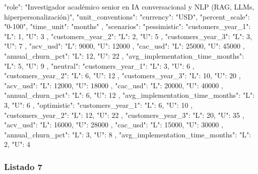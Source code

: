 \begin{APACode}
{
  "role": "Investigador académico senior en IA conversacional y NLP (RAG, LLMs, hiperpersonalización)",
  "unit_conventions": {
    "currency": "USD",
    "percent_scale": "0-100",
    "time_unit": "months"
  },
  "scenarios": {
    "pessimistic": {
      "customers_year_1": {
        "L": 1,
        "U": 3
      },
      "customers_year_2": {
        "L": 2,
        "U": 5
      },
      "customers_year_3": {
        "L": 3,
        "U": 7
      },
      "acv_usd": {
        "L": 9000,
        "U": 12000
      },
      "cac_usd": {
        "L": 25000,
        "U": 45000
      },
      "annual_churn_pct": {
        "L": 12,
        "U": 22
      },
      "avg_implementation_time_months": {
        "L": 5,
        "U": 9
      }
    },
    "neutral": {
      "customers_year_1": {
        "L": 3,
        "U": 6
      },
      "customers_year_2": {
        "L": 6,
        "U": 12
      },
      "customers_year_3": {
        "L": 10,
        "U": 20
      },
      "acv_usd": {
        "L": 12000,
        "U": 18000
      },
      "cac_usd": {
        "L": 20000,
        "U": 40000
      },
      "annual_churn_pct": {
        "L": 6,
        "U": 12
      },
      "avg_implementation_time_months": {
        "L": 3,
        "U": 6
      }
    },
    "optimistic": {
      "customers_year_1": {
        "L": 6,
        "U": 10
      },
      "customers_year_2": {
        "L": 12,
        "U": 22
      },
      "customers_year_3": {
        "L": 20,
        "U": 35
      },
      "acv_usd": {
        "L": 16000,
        "U": 28000
      },
      "cac_usd": {
        "L": 15000,
        "U": 30000
      },
      "annual_churn_pct": {
        "L": 3,
        "U": 8
      },
      "avg_implementation_time_months": {
        "L": 2,
        "U": 4
      }
    }
  }
}
\end{APACode}

\subsubsection{Listado 7}
\label{anexo:code-6-3-2-7}

